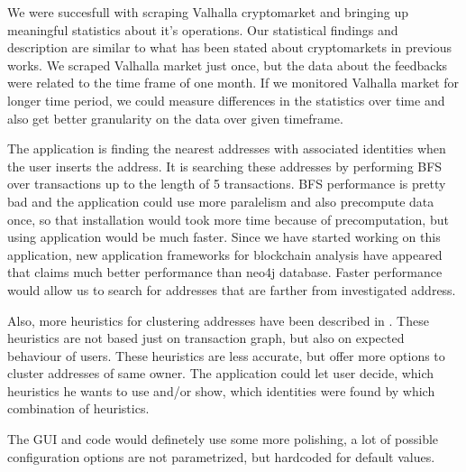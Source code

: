 \documentclass[
  digital, %
  table,   %
  lof,     %
  lot,     %
  oneside
]{fithesis3}
\begin{document}
We were succesfull with scraping Valhalla cryptomarket and
bringing up meaningful statistics about it's operations.
Our statistical findings and description are similar to what has been stated about
cryptomarkets in previous works.
We scraped Valhalla market just once, but the data about the feedbacks were
related to the time frame of one month. If we monitored Valhalla market for longer time period,
we could measure differences in the statistics over time and also get better granularity
on the data over given timeframe.

The application is finding the nearest addresses with associated identities when the user inserts the address.
It is searching these addresses by performing BFS over transactions up to the length of 5 transactions.
BFS performance is pretty bad and the application could use more paralelism and also precompute data once, so that
installation would took more time because of precomputation, but using application would be much faster.
Since we have started working on this application, new
application frameworks for blockchain analysis have appeared \parencite{kalodner2017blocksci} that claims much better performance than
neo4j database. Faster performance would allow us to search for addresses that are farther from investigated address.

Also, more heuristics for clustering addresses have been described in 
\parencite{androulaki2013evaluating}. These heuristics are not based just on transaction graph, but also
on expected behaviour of users. These heuristics are less accurate, but 
offer more options to cluster addresses of same owner. The application could let user decide, which heuristics
he wants to use and/or show, which identities were found by which combination of heuristics.

The GUI and code would definetely use some more polishing, a lot of possible configuration options
are not parametrized, but hardcoded for default values.
\end{document}
